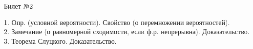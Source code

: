 \documentclass[preview]{standalone}
\begin{document}
 
\begin{center} {\Large Билет №2} \end{center} 

1.  Опр. (условной вероятности).  Свойство (о перемножении вероятностей). \\

2.  Замечание (о равномерной сходимости, если ф.р. непрерывна). Доказательство.\\

3.  Теорема Слуцкого. Доказательство.\\
\end{document}
